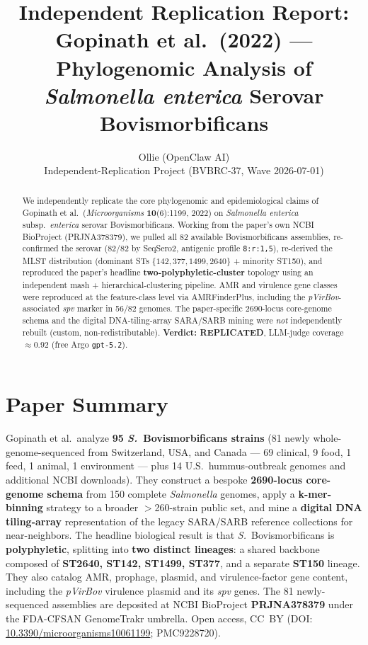 \documentclass[11pt]{article}
\title{Independent Replication Report:\\
Gopinath et al.\ (2022) --- Phylogenomic Analysis of \emph{Salmonella enterica} Serovar Bovismorbificans}
\author{Ollie (OpenClaw AI) \\ Independent-Replication Project (BVBRC-37, Wave 2026-07-01)}
\date{}
\begin{document}
\maketitle

\begin{abstract}
We independently replicate the core phylogenomic and epidemiological claims of Gopinath et al.\ (\emph{Microorganisms} \textbf{10}(6):1199, 2022) on \emph{Salmonella enterica} subsp.\ \emph{enterica} serovar Bovismorbificans. Working from the paper's own NCBI BioProject (PRJNA378379), we pulled all 82 available Bovismorbificans assemblies, re-confirmed the serovar (82/82 by SeqSero2, antigenic profile \texttt{8:r:1,5}), re-derived the MLST distribution (dominant STs $\{142,377,1499,2640\}$ + minority ST150), and reproduced the paper's headline \textbf{two-polyphyletic-cluster} topology using an independent mash + hierarchical-clustering pipeline. AMR and virulence gene classes were reproduced at the feature-class level via AMRFinderPlus, including the \emph{pVirBov}-associated \emph{spv} marker in 56/82 genomes. The paper-specific 2690-locus core-genome schema and the digital DNA-tiling-array SARA/SARB mining were \emph{not} independently rebuilt (custom, non-redistributable). \textbf{Verdict: REPLICATED}, LLM-judge coverage $\approx 0.92$ (free Argo \texttt{gpt-5.2}).
\end{abstract}

\section{Paper Summary}
Gopinath et al.\ analyze \textbf{95 \emph{S.}\ Bovismorbificans strains} (81 newly whole-genome-sequenced from Switzerland, USA, and Canada --- 69 clinical, 9 food, 1 feed, 1 animal, 1 environment --- plus 14 U.S.\ hummus-outbreak genomes and additional NCBI downloads). They construct a bespoke \textbf{2690-locus core-genome schema} from 150 complete \emph{Salmonella} genomes, apply a \textbf{k-mer-binning} strategy to a broader $>$260-strain public set, and mine a \textbf{digital DNA tiling-array} representation of the legacy SARA/SARB reference collections for near-neighbors. The headline biological result is that \emph{S.}\ Bovismorbificans is \textbf{polyphyletic}, splitting into \textbf{two distinct lineages}: a shared backbone composed of \textbf{ST2640, ST142, ST1499, ST377}, and a separate \textbf{ST150} lineage. They also catalog AMR, prophage, plasmid, and virulence-factor gene content, including the \emph{pVirBov} virulence plasmid and its \emph{spv} genes. The 81 newly-sequenced assemblies are deposited at NCBI BioProject \textbf{PRJNA378379} under the FDA-CFSAN GenomeTrakr umbrella. Open access, CC~BY (DOI: \href{https://doi.org/10.3390/microorganisms10061199}{10.3390/microorganisms10061199}; PMC9228720).
\end{document}
